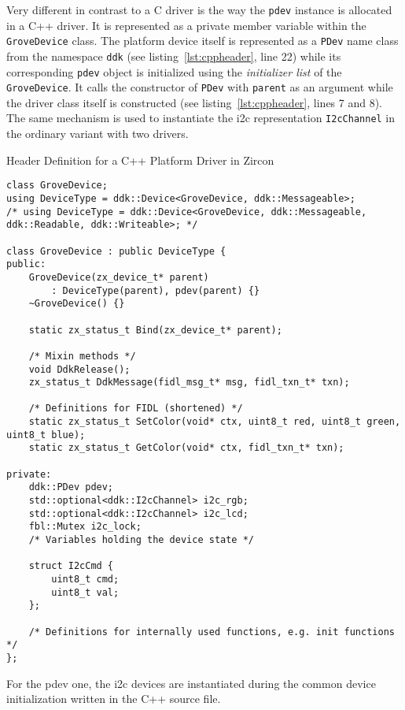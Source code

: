 Very different in contrast to a C driver is the way the \texttt{pdev} instance is allocated in a C++ driver.
It is represented as a private member variable within the \texttt{GroveDevice} class.
The platform device itself is represented as a \texttt{PDev} name class from the namespace \texttt{ddk} (see listing~\ref{lst:cppheader}, line 22) while its corresponding \texttt{pdev} object is initialized using the \textit{initializer list} of the \texttt{GroveDevice}.
It calls the constructor of \texttt{PDev} with \texttt{parent} as an argument while the driver class itself is constructed (see listing~\ref{lst:cppheader}, lines 7 and 8).
The same mechanism is used to instantiate the \ac{i2c} representation \texttt{I2cChannel} in the ordinary variant with two drivers.
%
\begin{listing} [H]
    \caption{Header Definition for a C++ Platform Driver in Zircon}
\label{lst:cppheader}
\begin{verbatim}
class GroveDevice;
using DeviceType = ddk::Device<GroveDevice, ddk::Messageable>;
/* using DeviceType = ddk::Device<GroveDevice, ddk::Messageable, ddk::Readable, ddk::Writeable>; */

class GroveDevice : public DeviceType {
public:
    GroveDevice(zx_device_t* parent)
        : DeviceType(parent), pdev(parent) {}
    ~GroveDevice() {}

    static zx_status_t Bind(zx_device_t* parent);

    /* Mixin methods */
    void DdkRelease();
    zx_status_t DdkMessage(fidl_msg_t* msg, fidl_txn_t* txn);

    /* Definitions for FIDL (shortened) */
    static zx_status_t SetColor(void* ctx, uint8_t red, uint8_t green, uint8_t blue);
    static zx_status_t GetColor(void* ctx, fidl_txn_t* txn);

private:
    ddk::PDev pdev;
    std::optional<ddk::I2cChannel> i2c_rgb;
    std::optional<ddk::I2cChannel> i2c_lcd;
    fbl::Mutex i2c_lock;
    /* Variables holding the device state */

    struct I2cCmd {
        uint8_t cmd;
        uint8_t val;
    };

    /* Definitions for internally used functions, e.g. init functions */
};
\end{verbatim}
\end{listing}
%
For the pdev one, the \ac{i2c} devices are instantiated during the common device initialization written in the C++ source file.
